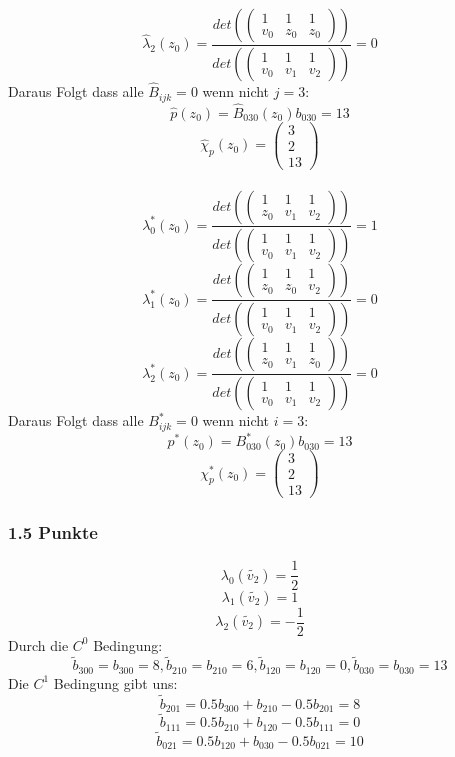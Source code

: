 $$ \hat{\lambda}_2(z_0)= \frac{det(\begin{pmatrix}1 & 1 & 1\\ v_0 & z_0 & z_0\end{pmatrix})}{ det(\begin{pmatrix}1 & 1 & 1\\ v_0 & v_1 & v_2\end{pmatrix})} = 0$$
Daraus Folgt dass alle $\hat{B}_{ijk} = 0$ wenn nicht $j=3$:\\
$$\hat{p}(z_0) = \hat{B}_{030}(z_0) b_{030} = 13$$
$$\hat{\chi}_p(z_0) = \begin{pmatrix}3\\ 2\\ 13\end{pmatrix}$$
\\
$$ \lambda^*_0(z_0)= \frac{det(\begin{pmatrix}1 & 1 & 1\\ z_0 & v_1 & v_2\end{pmatrix})}{ det(\begin{pmatrix}1 & 1 & 1\\ v_0 & v_1 & v_2\end{pmatrix})} = 1$$
$$ \lambda^*_1(z_0)= \frac{det(\begin{pmatrix}1 & 1 & 1\\ z_0 & z_0 & v_2\end{pmatrix})}{ det(\begin{pmatrix}1 & 1 & 1\\ v_0 & v_1 & v_2\end{pmatrix})} = 0$$
$$ \lambda^*_2(z_0)= \frac{det(\begin{pmatrix}1 & 1 & 1\\ z_0 & v_1 & z_0\end{pmatrix})}{ det(\begin{pmatrix}1 & 1 & 1\\ v_0 & v_1 & v_2\end{pmatrix})} = 0$$
Daraus Folgt dass alle $B^*_{ijk} = 0$ wenn nicht $i=3$:\\
$$p^* (z_0) = B^*_{030}(z_0) b_{030} = 13$$
$$\chi_p^* (z_0) = \begin{pmatrix}3\\ 2\\ 13\end{pmatrix}$$
\subsubsection{1.5 Punkte}
$$ \lambda_0(\tilde{v_2}) = \frac{1}{2}$$
 $$ \lambda_1(\tilde{v_2})= 1$$
$$ \lambda_2(\tilde{v_2}) = -\frac{1}{2}$$
Durch die $C^0$ Bedingung:\\
$$\tilde{b}_{300} = b_{300} = 8, \tilde{b}_{210} = b_{210} = 6, \tilde{b}_{120} = b_{120} = 0, \tilde{b}_{030} = b_{030} =13$$
Die $C^1$ Bedingung gibt uns:\\
$$\tilde{b}_{201} = 0.5 b_{300} + b_{210} - 0.5  b_{201} = 8$$
$$\tilde{b}_{111} = 0.5 b_{210} + b_{120} - 0.5  b_{111} = 0$$
$$\tilde{b}_{021} = 0.5 b_{120} + b_{030} - 0.5  b_{021} = 10$$
